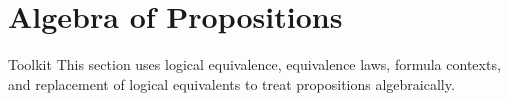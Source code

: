 \section{Algebra of Propositions}

\begin{toolkitbox}{Toolkit}
This section uses logical equivalence, equivalence laws, formula contexts, and
replacement of logical equivalents to treat propositions algebraically.
\end{toolkitbox}




